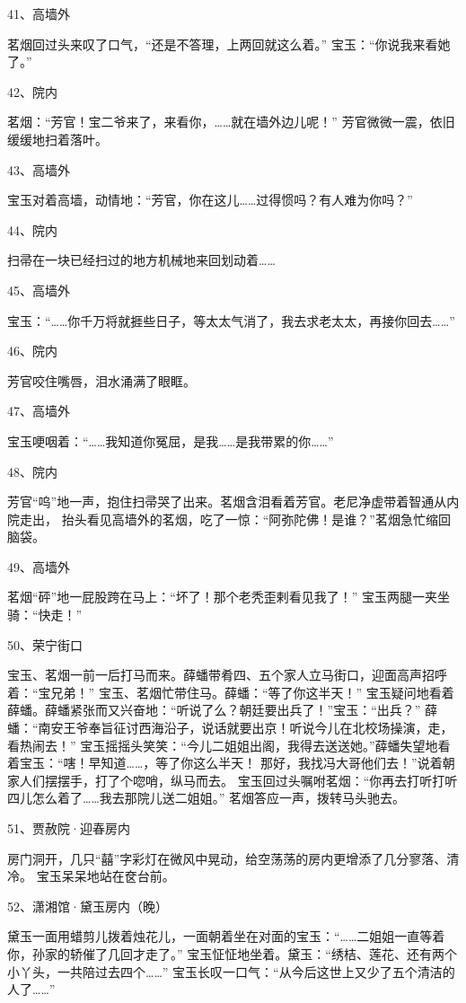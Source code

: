 41、高墙外\par
茗烟回过头来叹了口气，“还是不答理，上两回就这么着。”
宝玉：“你说我来看她了。”

42、院内\par
茗烟：“芳官！宝二爷来了，来看你，……就在墙外边儿呢！”
芳官微微一震，依旧缓缓地扫着落叶。

43、高墙外\par
宝玉对着高墙，动情地：“芳官，你在这儿……过得惯吗？有人难为你吗？”

44、院内\par
扫帚在一块已经扫过的地方机械地来回划动着……

45、高墙外\par
宝玉：“……你千万将就捱些日子，等太太气消了，我去求老太太，再接你回去……”

46、院内\par
芳官咬住嘴唇，泪水涌满了眼眶。

47、高墙外\par
宝玉哽咽着：“……我知道你冤屈，是我……是我带累的你……”

48、院内\par
芳官“呜”地一声，抱住扫帚哭了出来。茗烟含泪看着芳官。老尼净虚带着智通从内院走出，
抬头看见高墙外的茗烟，吃了一惊：“阿弥陀佛！是谁？”茗烟急忙缩回脑袋。

49、高墙外\par
茗烟“砰”地一屁股跨在马上：“坏了！那个老秃歪剌看见我了！”
宝玉两腿一夹坐骑：“快走！”

50、荣宁街口\par
宝玉、茗烟一前一后打马而来。薛蟠带肴四、五个家人立马街口，迎面高声招呼着：“宝兄弟！”
宝玉、茗烟忙带住马。薛蟠：“等了你这半天！”
宝玉疑问地看着薛蟠。薛蟠紧张而又兴奋地：“听说了么？朝廷要出兵了！”宝玉：“出兵？”
薛蟠：“南安王爷奉旨征讨西海沿子，说话就要出京！听说今儿在北校场操演，走，看热闹去！”
宝玉摇摇头笑笑：“今儿二姐姐出阁，我得去送送她。”薛蟠失望地看着宝玉：“嗐！早知道……，等了你这么半天！
那好，我找冯大哥他们去！”说着朝家人们摆摆手，打了个唿哨，纵马而去。
宝玉回过头嘱咐茗烟：“你再去打听打听四儿怎么着了……我去那院儿送二姐姐。”
茗烟答应一声，拨转马头驰去。

51、贾赦院·迎春房内\par
房门洞开，几只“囍”字彩灯在微风中晃动，给空荡荡的房内更增添了几分寥落、清冷。
宝玉呆呆地站在奁台前。

52、潇湘馆·黛玉房内（晚）\par
黛玉一面用蜡剪儿拨着烛花儿，一面朝着坐在对面的宝玉：“……二姐姐一直等着你，孙家的轿催了几回才走了。”
宝玉怔怔地坐着。黛玉：“绣桔、莲花、还有两个小丫头，一共陪过去四个……”
宝玉长叹一口气：“从今后这世上又少了五个清洁的人了……”

